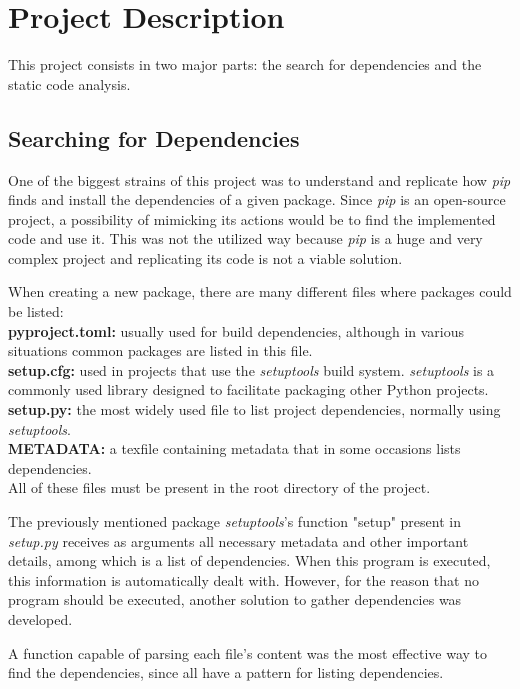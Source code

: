 \chapter{Project Description}
This project consists in two major parts: the search for dependencies and the static code analysis. 

\section{Searching for Dependencies}
One of the biggest strains of this project was to understand and replicate how \textit{pip} finds and install the dependencies of a given package. Since \textit{pip} is an open-source project, a possibility of mimicking its actions would be to find the implemented code and use it. This was not the utilized way because \textit{pip} is a huge and very complex project and replicating its code is not a viable solution.

When creating a new package, there are many different files where packages could be listed:\\

\textbf{pyproject.toml:} usually used for build dependencies, although in various situations common packages are listed in this file.\\

\textbf{setup.cfg:} used in projects that use the \textit{setuptools} build system. \textit{setuptools} is a commonly used library designed to facilitate packaging other Python projects.\\

\textbf{setup.py:} the most widely used file to list project dependencies, normally using \textit{setuptools}.\\

\textbf{METADATA:} a texfile containing metadata that in some occasions lists dependencies.\\ 

All of these files must be present in the root directory of the project.

The previously mentioned package \textit{setuptools}'s function "setup" present in \textit{setup.py} receives as arguments all necessary metadata and other important details, among which is a list of dependencies. When this program is executed, this information is automatically dealt with. However, for the reason that no program should be executed, another solution to gather dependencies was developed.

A function capable of parsing each file's content was the most effective way to find the dependencies, since all have a pattern for listing dependencies.

